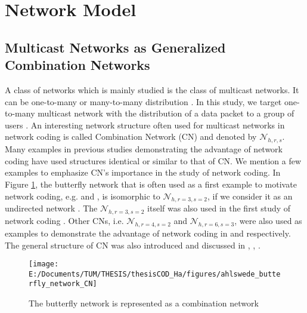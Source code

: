 \section{Network Model}

\subsection{Multicast Networks as Generalized Combination Networks}

A class of networks which is mainly studied is the class of multicast
networks. It can be one-to-many or many-to-many distribution \cite{Harte:2008}.
In this study, we target one-to-many multicast network with the distribution
of a data packet to a group of users \cite{Zhang:2012}. An interesting
network structure often used for multicast networks in network coding
is called Combination Network (CN) and denoted by $\mathcal{N}_{h,r,s}$.
Many examples in previous studies demonstrating the advantage of network
coding have used structures identical or similar to that of CN. We
mention a few examples to emphasize CN's importance in the study of
network coding. In Figure \ref{fig:butterfly_nw_cn}, the butterfly
network that is often used as a first example to motivate network
coding, e.g. \cite[Fig. 7]{Ahlswede:2000} and \cite[Fig. 1]{Sanders:2003},
is isomorphic to $\mathcal{N}_{h,r=3,s=2}$, if we consider it as
an undirected network \cite{Maheshwar:2012}. The $\mathcal{N}_{h,r=3,s=2}$
itself was also used in the first study of network coding \cite{Ahlswede:2000}.
Other CNs, i.e. $\mathcal{N}_{h,r=4,s=2}$ and $\mathcal{N}_{h,r=6,s=3}$,
were also used as examples to demonstrate the advantage of network
coding in \cite[Fig. 2]{Sanders:2003} and \cite[Fig. 2]{Jaggi:2005}
respectively. The general structure of CN was also introduced and
discussed in \cite[Sec. 4.3]{Fragouli:2006}, \cite[Sec. 4.1]{Yeung:2006},
\cite{Ngai:2004,Xiao:2007}.
\begin{figure}[H]
\caption{The butterfly network is represented as a combination network \label{fig:butterfly_nw_cn}}

\centering{}\texttt{[image: E:/Documents/TUM/THESIS/thesisCOD\_Ha/figures/ahlswede\_butterfly\_network\_CN]}
\end{figure}

